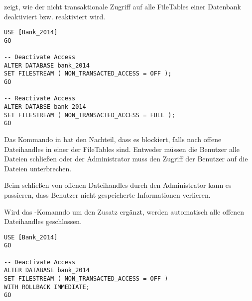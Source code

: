            zeigt, wie der nicht transaktionale Zugriff auf
          alle FileTables einer Datenbank deaktiviert bzw. reaktiviert wird.
          \begin{lstlisting}[language=ms_sql, caption={Deaktivieren und
          reaktivieren des Zugriffs auf FileTables}, label=admin04_05]
USE [Bank_2014]
GO

-- Deactivate Access
ALTER DATABASE bank_2014
SET FILESTREAM ( NON_TRANSACTED_ACCESS = OFF );
GO

-- Reactivate Access
ALTER DATABSE bank_2014
SET FILESTREAM ( NON_TRANSACTED_ACCESS = FULL );
GO
          \end{lstlisting}
          Das Kommando in  hat den Nachteil, dass
          es blockiert, falls noch offene Dateihandles in einer der FileTables
          sind. Entweder müssen die Benutzer alle Dateien schließen
          oder der Administrator muss den Zugriff der Benutzer auf die Dateien
          unterbrechen.
          \begin{merke}
            Beim schließen von offenen Dateihandles durch den Administrator kann
            es passieren, dass Benutzer nicht gespeicherte Informationen
            verlieren.
          \end{merke}
          Wird das -Komanndo um den Zusatz
           ergänzt, werden automatisch
          alle offenen Dateihandles geschlossen.
          \begin{lstlisting}[language=ms_sql, caption={Deaktivieren und
          des Zugriffs auf FileTables und gleichzeitiges Schließen aller
          offenen Dateihandles}, label=admin04_06]
USE [Bank_2014]
GO

-- Deactivate Access
ALTER DATABASE bank_2014
SET FILESTREAM ( NON_TRANSACTED_ACCESS = OFF )
WITH ROLLBACK IMMEDIATE;
GO
          \end{lstlisting}
